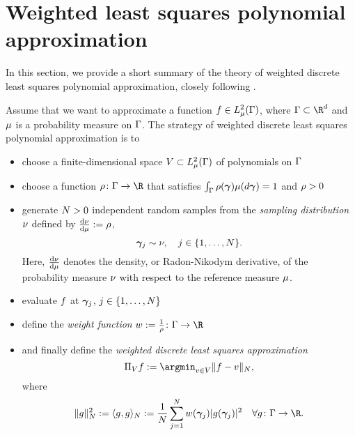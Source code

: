 \section{Weighted least squares polynomial approximation}

\label{sec:dpls}
In this section, we provide a short summary of the theory of weighted discrete least squares polynomial approximation, closely following \cite{cohen2016optimal}.

Assume that we want to approximate a function $f\in L^2_{\mu}(\Gamma)$, where $\domPS\subset\R^\dps$ and $\mu$ is a probability measure on $\Gamma$. %
The strategy of weighted discrete least squares polynomial approximation is to 
\begin{itemize}
	\item choose a finite-dimensional space $V\subset L^2_{\mu}(\Gamma)$ of polynomials on $\Gamma$
	\item choose a function $\density\colon\domPS\to\R$ that satisfies $\int_{\Gamma}\rho(\bm{\gamma}) \mu(d\bm{\gamma})=1$ and $\rho>0$
	\item generate $N>0$ independent random samples from the \emph{sampling distribution} $\nu$ defined by $\frac{\text{d}\nu}{\text{d}\mu}:=\rho$, 
	$$
	\bm{\gamma}_j\sim \nu, \quad j\in\{1,\dots,N\}.
	$$
	Here, $\frac{\text{d}\nu}{\text{d}\mu}$ denotes the density, or Radon-Nikodym derivative, of the probability measure $\nu$ with respect to the reference measure $\mu$.
	\item evaluate $f$ at $\bm{\gamma}_j$, $j\in\{1,\dots,N\}$
	
	\item define the \emph{weight function} $\weight:=\frac{1}{\density}\colon \domPS\to\R$
	\item  and finally define the \emph{weighted discrete least squares approximation}
	\begin{equation}
	\label{eq:dpls:def}
	\P_{\vsp}\rs:=\argmin_{\p\in \vsp} \norm{\rs-\p}{\NS},
	\end{equation}
	where 
	\begin{equation}
	\label{eq:dpls:discretenorm}
	\norm{\f}{\NS}^2:=\langle \f,\f\rangle_{\NS}:=\frac{1}{\NS}\sum_{j=1}^{\NS} w(\psmi_j)|\f(\psmi_j)|^2\quad \forall \f\colon\domPS\to\R.
	\end{equation}
\end{itemize}
